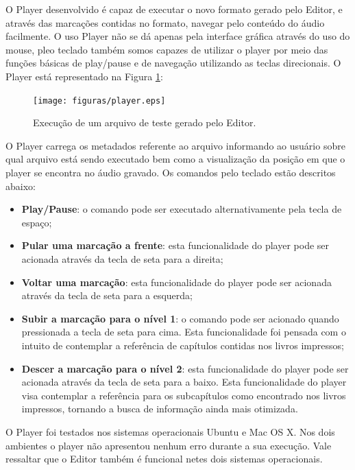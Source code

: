 
O Player desenvolvido é capaz de executar o novo formato gerado pelo Editor, e através das marcações contidas no formato, navegar pelo conteúdo do áudio facilmente. O uso Player não se dá apenas pela interface gráfica através do uso do mouse, pleo teclado também somos capazes de utilizar o player por meio das funções básicas de play/pause e de navegação utilizando as teclas direcionais. O Player está representado na Figura \ref{player}:

 \begin{figure}[ht]
	\centering
		\texttt{[image: figuras/player.eps]}
	\caption{Execução de um arquivo de teste gerado pelo Editor.}
	\label{player}
\end{figure}

O Player carrega os metadados referente ao arquivo informando ao usuário sobre qual arquivo está sendo executado bem como a visualização da posição em que o player se encontra no áudio gravado. Os comandos pelo teclado estão descritos abaixo:

\begin{itemize}
	\item{\textbf{Play/Pause}:} o comando pode ser executado alternativamente pela tecla de espaço;
	\item{\textbf{Pular uma marcação a frente}:} esta funcionalidade do player pode ser acionada através da tecla de seta para a direita;
	\item{\textbf{Voltar uma marcação}:} esta funcionalidade do player pode ser acionada através da tecla de seta para a esquerda;
	\item{\textbf{Subir a marcação para o nível 1}:} o comando pode ser acionado quando pressionada a tecla de seta para cima. Esta funcionalidade foi pensada com o intuito de contemplar a referência de capítulos contidas nos livros impressos;
	\item{\textbf{Descer a marcação para o nível 2}:} esta funcionalidade do player pode ser acionada através da tecla de seta para a baixo. Esta funcionalidade do player visa contemplar a referência para os subcapítulos como encontrado nos livros impressos, tornando a busca de informação ainda mais otimizada.
\end{itemize}

O Player foi testados nos sistemas operacionais Ubuntu e Mac OS X. Nos dois ambientes o player não apresentou nenhum erro durante a sua execução. Vale ressaltar que o Editor também é funcional netes dois sistemas operacionais.
